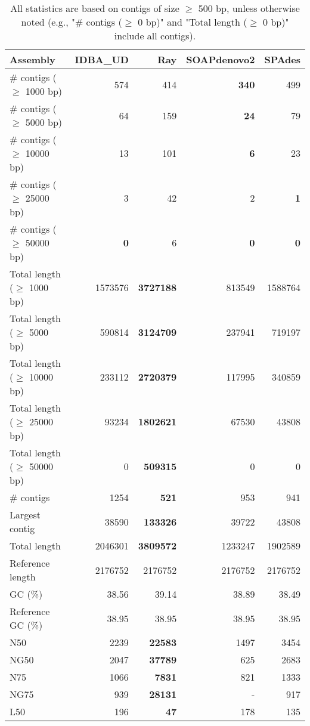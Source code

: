 \documentclass[12pt,a4paper]{article}
\begin{document}
\begin{table}[ht]
\begin{center}
\caption{All statistics are based on contigs of size $\geq$ 500 bp, unless otherwise noted (e.g., "\# contigs ($\geq$ 0 bp)" and "Total length ($\geq$ 0 bp)" include all contigs).}
\begin{tabular}{|l*{4}{|r}|}
\hline
Assembly & IDBA\_UD & Ray & SOAPdenovo2 & SPAdes \\ \hline
\# contigs ($\geq$ 1000 bp) & 574 & 414 & {\bf 340} & 499 \\ \hline
\# contigs ($\geq$ 5000 bp) & 64 & 159 & {\bf 24} & 79 \\ \hline
\# contigs ($\geq$ 10000 bp) & 13 & 101 & {\bf 6} & 23 \\ \hline
\# contigs ($\geq$ 25000 bp) & 3 & 42 & 2 & {\bf 1} \\ \hline
\# contigs ($\geq$ 50000 bp) & {\bf 0} & 6 & {\bf 0} & {\bf 0} \\ \hline
Total length ($\geq$ 1000 bp) & 1573576 & {\bf 3727188} & 813549 & 1588764 \\ \hline
Total length ($\geq$ 5000 bp) & 590814 & {\bf 3124709} & 237941 & 719197 \\ \hline
Total length ($\geq$ 10000 bp) & 233112 & {\bf 2720379} & 117995 & 340859 \\ \hline
Total length ($\geq$ 25000 bp) & 93234 & {\bf 1802621} & 67530 & 43808 \\ \hline
Total length ($\geq$ 50000 bp) & 0 & {\bf 509315} & 0 & 0 \\ \hline
\# contigs & 1254 & {\bf 521} & 953 & 941 \\ \hline
Largest contig & 38590 & {\bf 133326} & 39722 & 43808 \\ \hline
Total length & 2046301 & {\bf 3809572} & 1233247 & 1902589 \\ \hline
Reference length & 2176752 & 2176752 & 2176752 & 2176752 \\ \hline
GC (\%) & 38.56 & 39.14 & 38.89 & 38.49 \\ \hline
Reference GC (\%) & 38.95 & 38.95 & 38.95 & 38.95 \\ \hline
N50 & 2239 & {\bf 22583} & 1497 & 3454 \\ \hline
NG50 & 2047 & {\bf 37789} & 625 & 2683 \\ \hline
N75 & 1066 & {\bf 7831} & 821 & 1333 \\ \hline
NG75 & 939 & {\bf 28131} & - & 917 \\ \hline
L50 & 196 & {\bf 47} & 178 & 135 \\ \hline

\end{tabular}
\end{center}
\end{table}
\end{document}
